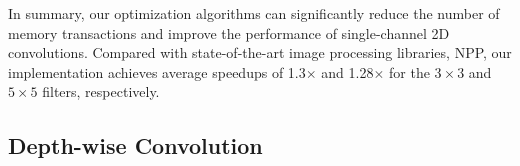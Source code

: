 In summary, our optimization algorithms can significantly reduce the number of memory transactions and improve the performance of single-channel 2D
convolutions. Compared with state-of-the-art image processing libraries, NPP, our implementation achieves average speedups of 1.3$\times$ and 1.28$\times$ for the $3 \times 3$ and $5 \times 5$ filters, respectively.

\subsection{Depth-wise Convolution}
\label{3dconvexp}

